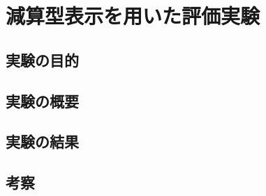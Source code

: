 \chapter{減算型表示を用いた評価実験}
\label{chapter:experiment_dr}

\section{実験の目的}

\section{実験の概要}

\section{実験の結果}

\section{考察}